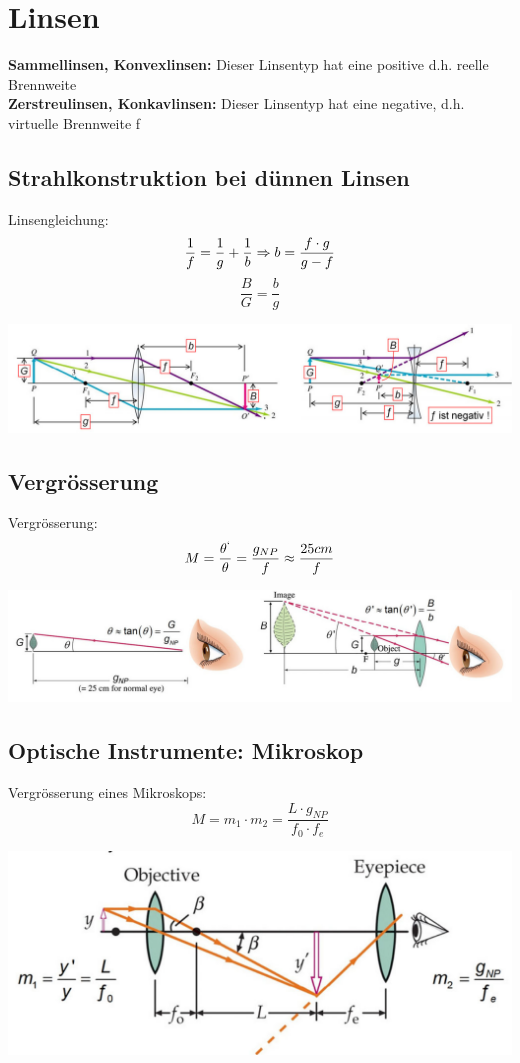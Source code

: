 \section{Linsen}
\textbf{Sammellinsen, Konvexlinsen:} 
Dieser Linsentyp hat eine positive d.h. reelle Brennweite
\\
\textbf{Zerstreulinsen, Konkavlinsen:} 
Dieser Linsentyp hat eine negative, d.h. virtuelle Brennweite f

\subsection{Strahlkonstruktion bei dünnen Linsen}
Linsengleichung:
\[
	\frac{1}{f} = \frac{1}{g} + \frac{1}{b} \\
	\Rightarrow \\
	b=\frac{f \cdot g}{g -f} \\ \\
\]
\[
	\frac{B}{G} =\frac{b}{g}
\]
\begin{center}
	\includegraphics[scale = 0.25]{../fig/strahlkonstruktion.jpg}
\end{center}

\subsection{Vergrösserung}
Vergrösserung:
\[
	M=\frac{\theta^`}{\theta}= \frac{g_{NP}}{f} \approx \frac{25cm}{f}
\]
\begin{center}
	\includegraphics[scale = 0.25]{../fig/vergroesserung.jpg}
\end{center}

\subsection{Optische Instrumente: Mikroskop}
Vergrösserung eines Mikroskops:
\[
	M=m_1 \cdot m_2 = \frac{L\cdot g_{NP}}{f_0 \cdot f_e}
\]
\begin{center}
	\includegraphics[scale = 0.2]{../fig/mikroskop.jpg}
\end{center}


